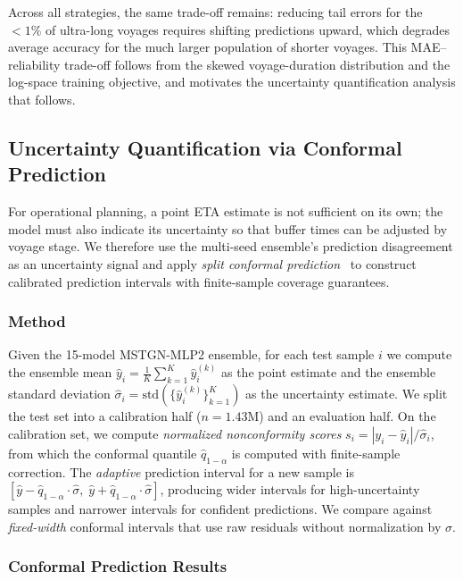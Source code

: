 \documentclass[sigconf,anonymous]{acmart}%
\begin{document}
Across all strategies, the same trade-off remains: reducing tail errors for the $< 1\%$ of ultra-long voyages requires shifting predictions upward, which degrades average accuracy for the much larger population of shorter voyages. This MAE--reliability trade-off follows from the skewed voyage-duration distribution and the log-space training objective, and motivates the uncertainty quantification analysis that follows.

\subsection{Uncertainty Quantification via Conformal Prediction}
\label{sec:uq}

For operational planning, a point ETA estimate is not sufficient on its own; the model must also indicate its uncertainty so that buffer times can be adjusted by voyage stage. We therefore use the multi-seed ensemble's prediction disagreement as an uncertainty signal and apply \textit{split conformal prediction}~\cite{vovk2005conformal,romano2019cqr} to construct calibrated prediction intervals with finite-sample coverage guarantees.

\subsubsection{Method}
Given the 15-model MSTGN-MLP2 ensemble, for each test sample $i$ we compute the ensemble mean $\hat{y}_i = \frac{1}{K}\sum_{k=1}^{K}\hat{y}_i^{(k)}$ as the point estimate and the ensemble standard deviation $\hat{\sigma}_i = \text{std}(\{\hat{y}_i^{(k)}\}_{k=1}^{K})$ as the uncertainty estimate.
We split the test set into a calibration half ($n=1.43$M) and an evaluation half.
On the calibration set, we compute \textit{normalized nonconformity scores} $s_i = |y_i - \hat{y}_i| / \hat{\sigma}_i$, from which the conformal quantile $\hat{q}_{1{-}\alpha}$ is computed with finite-sample correction.
The \textit{adaptive} prediction interval for a new sample is $[\hat{y} - \hat{q}_{1{-}\alpha} \cdot \hat{\sigma},\; \hat{y} + \hat{q}_{1{-}\alpha} \cdot \hat{\sigma}]$, producing wider intervals for high-uncertainty samples and narrower intervals for confident predictions.
We compare against \textit{fixed-width} conformal intervals that use raw residuals without normalization by $\hat{\sigma}$.

\subsubsection{Conformal Prediction Results}
\end{document}

